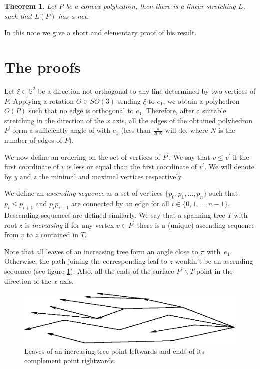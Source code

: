 \documentclass[openright, 12pt]{article}
\newtheorem{teorema}{Theorem}
\begin{document}
\begin{teorema}\label{Str}
{\rm Let $P$ be a convex polyhedron, then there is a linear stretching $L$, such that $L(P)$ has a net.}
\end{teorema}

In this note we give a short and elementary proof of his result.

\section{The proofs}


Let $\xi \in \mathbb{S}^2$ be a direction not orthogonal to any line determined by two vertices of $P$. Applying a rotation $O \in SO(3)$ sending $\xi $ to $e_1 $, we obtain a polyhedron $O(P)$ such that no edge is orthogonal to $e_1$. Therefore, after a suitable stretching in the direction of the $x$ axis, all the edges of the obtained polyhedron $P^{\prime}$  form a sufficiently angle of with $e_1$ (less than $\frac{\pi}{20 N}$ will do, where $N$ is the number of edges of $P$).


We now define an ordering on the set of vertices of $P^{\prime}$. We say that $v \leq v^{\prime}$ if the first coordinate of $v$ is less or equal than the first coordinate of $v^{\prime}$. We will denote by $y$ and $z$ the minimal and maximal vertices respectively.

We define an \textit{ascending sequence} as a set of vertices $\{ p_0, p_1, \ldots , p_n   \}$ such that $p_i \leq p_{i+1}$ and $p_i p_{i+1}$ are connected by an edge for all $i \in \{ 0,1, \ldots, n-1 \} $. Descending sequences are defined similarly. We say that a spanning tree $T$ with root $z$ is \textit{increasing} if for any vertex $v\in P^{\prime}$ there is a (unique) ascending sequence from $v$ to $z$ contained in $T$. 

Note that all leaves of an increasing tree form an angle close to $\pi$ with~$e_1$. %
Otherwise, the path joining the corresponding leaf to $z$ wouldn't be an ascending sequence (see figure \ref{Mon}). Also, all the ends of the surface $P^{\prime} \backslash T$ point in the direction of the $x$ axis.




\begin{figure}[h]
\centering
\includegraphics[scale=0.84]{Mono2.eps}
\caption{Leaves of an increasing tree point leftwards and ends of its complement point rightwards.}\label{Mon}
\end{figure}
\end{document}
